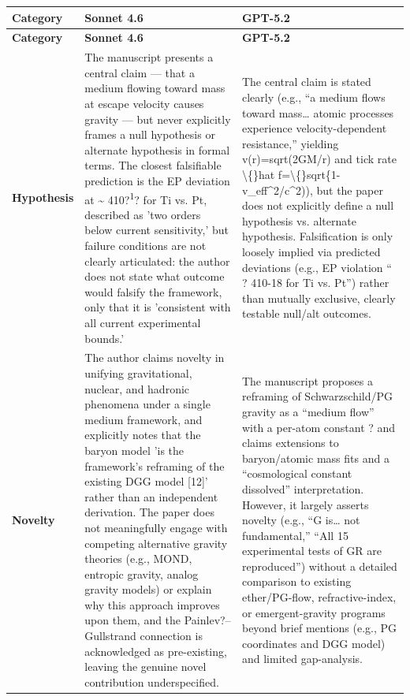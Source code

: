 \documentclass[11pt]{article}
\begin{document}
\begin{longtable}{@{} p{2.2cm} p{6.3cm} p{6.3cm} @{}}
\toprule
\textbf{Category} & \textbf{Sonnet 4.6} & \textbf{GPT-5.2} \\
\midrule
\endfirsthead
\toprule
\textbf{Category} & \textbf{Sonnet 4.6} & \textbf{GPT-5.2} \\
\midrule
\endhead
\bottomrule
\endlastfoot

\rowcolor{rowgray}
\textbf{Hypothesis} &
The manuscript presents a central claim --- that a medium flowing toward mass at escape velocity causes gravity --- but never explicitly frames a null hypothesis or alternate hypothesis in formal terms. The closest falsifiable prediction is the EP deviation at \texteta{} \textasciitilde{} 4\texttimes{}10?\textsuperscript{1}? for Ti vs. Pt, described as 'two orders below current sensitivity,' but failure conditions are not clearly articulated: the author does not state what outcome would falsify the framework, only that it is 'consistent with all current experimental bounds.' &
The central claim is stated clearly (e.g., ``a medium flows toward mass\ldots{} atomic processes experience velocity-dependent resistance,'' yielding v(r)=sqrt(2GM/r) and tick rate \textbackslash\{\}hat f=\textbackslash\{\}sqrt\{1-v\_eff\textasciicircum{}2/c\textasciicircum{}2)), but the paper does not explicitly define a null hypothesis vs. alternate hypothesis. Falsification is only loosely implied via predicted deviations (e.g., EP violation ``\texteta{} ? 4\texttimes{}10-18 for Ti vs. Pt'') rather than mutually exclusive, clearly testable null/alt outcomes. \\[6pt]

\textbf{Novelty} &
The author claims novelty in unifying gravitational, nuclear, and hadronic phenomena under a single medium framework, and explicitly notes that the baryon model 'is the framework's reframing of the existing DGG model [12]' rather than an independent derivation. The paper does not meaningfully engage with competing alternative gravity theories (e.g., MOND, entropic gravity, analog gravity models) or explain why this approach improves upon them, and the Painlev?--Gullstrand connection is acknowledged as pre-existing, leaving the genuine novel contribution underspecified. &
The manuscript proposes a reframing of Schwarzschild/PG gravity as a ``medium flow'' with a per-atom constant ? and claims extensions to baryon/atomic mass fits and a ``cosmological constant dissolved'' interpretation. However, it largely asserts novelty (e.g., ``G is\ldots{} not fundamental,'' ``All 15 experimental tests of GR are reproduced'') without a detailed comparison to existing ether/PG-flow, refractive-index, or emergent-gravity programs beyond brief mentions (e.g., PG coordinates and DGG model) and limited gap-analysis. \\[6pt]


\end{longtable}
\end{document}
